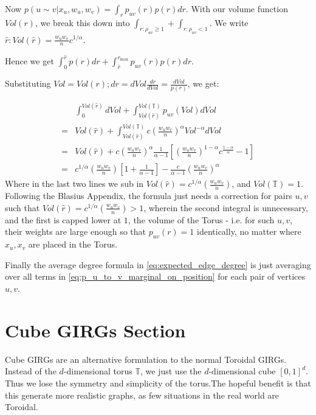 Now $p(u \sim v | x_u, w_u, w_v) = \int_r p_{uv}(r) p(r) dr$. With our volume function $Vol(r)$, we break this down into $\int_{r: \rho_{uv} \geq 1} + \int_{r: \rho_{uv} < 1}$. We write $\hat{r} : Vol(\hat{r}) = \frac{w_u w_v}{n} c^{1/\alpha}$.

Hence we get $\int_0^{\hat{r}} p(r) dr + \int_{\hat{r}}^{r_{\max}} p_{uv}(r) p(r) dr$.

Substituting $Vol = Vol(r); dr = dVol \frac{dr}{dVol} = \frac{dVol}{p(r)}$, we get:

\begin{align}
    & 
    \int_0^{Vol(\hat{r})} dVol + 
    \int_{Vol(\hat{r})}^{Vol(\mathbb{T})} p_{uv}(Vol) dVol
    \\
    =&
    Vol(\hat{r}) + 
    \int_{Vol(\hat{r})}^{Vol(\mathbb{T})} 
    c \left (\frac{w_u w_v}{n} \right )^\alpha Vol^{-\alpha}  
        dVol
    \\
    =&
    Vol(\hat{r}) + 
    c \left (\frac{w_u w_v}{n} \right )^\alpha \frac{1}{\alpha - 1}
        \left [
            \left (\frac{w_u w_v}{n} \right )^{1 - \alpha} c^{\frac{1 - \alpha}{\alpha}} - 1
        \right ]
    \\
    =&
    c^{1/\alpha} \left (\frac{w_u w_v}{n} \right ) 
        \left [ 1 + \frac{1}{\alpha - 1} \right ] 
    - 
    \frac{c}{\alpha - 1} \left (\frac{w_u w_v}{n} \right )^\alpha
    \label{eq:p_u_to_v_marginal_on_position}
\end{align}
Where in the last two lines we sub in $Vol(\hat{r}) = c^{1/\alpha} \left (\frac{w_u w_v}{n} \right )$, and $Vol(\mathbb{T}) = 1$. Following the Blasius Appendix, the formula just needs a correction for pairs $u, v$ such that $Vol(\hat{r}) = c^{1/\alpha} \left ( \frac{w_u w_v}{n} \right ) > 1$, wherein the second integral is unnecessary, and the first is capped lower at $1$, the volume of the Torus - i.e. for such $u, v$, their weights are large enough so that $p_{uv}(r) = 1$ identically, no matter where $x_u, x_v$ are placed in the Torus.

Finally the average degree formula in \cref{eq:expected_edge_degree} is just averaging over all terms in \cref{eq:p_u_to_v_marginal_on_position} for each pair of vertices $u, v$.



\section{Cube GIRGs Section}

Cube GIRGs are an alternative formulation to the normal Toroidal GIRGs. Instead of the $d$-dimensional torus $\mathbb{T}$, we just use the $d$-dimensional cube $[0,1]^d$. Thus we lose the symmetry and simplicity of the torus.The hopeful benefit is that this generate more realistic graphs, as few situations in the real world are Toroidal.

